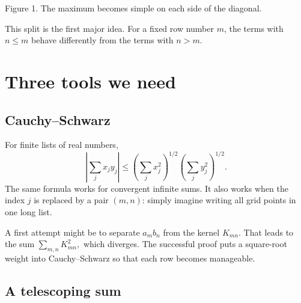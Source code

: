\documentclass[11pt]{article}
\newcommand{\abs}[1]{\left|#1\right|}
\begin{document}
\begin{center}

\small Figure 1. The maximum becomes simple on each side of the diagonal.
\end{center}

This split is the first major idea. For a fixed row number \(m\), the terms with \(n\leq m\) behave differently from the terms with \(n>m\).

\section{Three tools we need}

\subsection{Cauchy--Schwarz}

For finite lists of real numbers,
\[
  \abs{\sum_j x_jy_j}
  \leq
  \left(\sum_jx_j^2\right)^{1/2}
  \left(\sum_jy_j^2\right)^{1/2}.
  \tag{3}
\]
The same formula works for convergent infinite sums. It also works when the index \(j\) is replaced by a pair \((m,n)\): simply imagine writing all grid points in one long list.

\begin{ideaBox}
A first attempt might be to separate \(a_mb_n\) from the kernel \(K_{mn}\). That leads to the sum
\(
\sum_{m,n}K_{mn}^2,
\)
which diverges. The successful proof puts a square-root weight into Cauchy--Schwarz so that each row becomes manageable.
\end{ideaBox}

\subsection{A telescoping sum}
\end{document}
